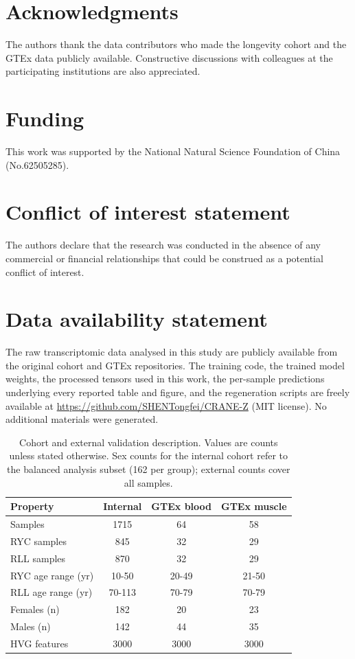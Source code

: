 \documentclass[11pt,a4paper]{article}
\begin{document}
\section{Acknowledgments}\label{sec:ack}
The authors thank the data contributors who made the longevity cohort and the GTEx data publicly available. Constructive discussions with colleagues at the participating institutions are also appreciated.

\section{Funding}\label{sec:fund}
This work was supported by the National Natural Science Foundation of China (No.62505285).

\section{Conflict of interest statement}\label{sec:coi}
The authors declare that the research was conducted in the absence of any commercial or financial relationships that could be construed as a potential conflict of interest.

\section{Data availability statement}\label{sec:dataavail}
The raw transcriptomic data analysed in this study are publicly available from the original cohort and GTEx repositories. The training code, the trained model weights, the processed tensors used in this work, the per-sample predictions underlying every reported table and figure, and the regeneration scripts are freely available at \href{https://github.com/SHENTongfei/CRANE-Z}{https://github.com/SHENTongfei/CRANE-Z} (MIT license). No additional materials were generated.

\begin{table}[htbp]
\caption{Cohort and external validation description. Values are counts unless stated otherwise. Sex counts for the internal cohort refer to the balanced analysis subset (162 per group); external counts cover all samples.}
\label{tab:cohort}
\begin{center}
\begin{tabular}{lccc}
\hline
Property & Internal & GTEx blood & GTEx muscle \\
\hline
Samples & 1715 & 64 & 58 \\
RYC samples & 845 & 32 & 29 \\
RLL samples & 870 & 32 & 29 \\
RYC age range (yr) & 10-50 & 20-49 & 21-50 \\
RLL age range (yr) & 70-113 & 70-79 & 70-79 \\
Females (n) & 182 & 20 & 23 \\
Males (n) & 142 & 44 & 35 \\
HVG features & 3000 & 3000 & 3000 \\
\hline
\end{tabular}
\end{center}
\end{table}
\end{document}
